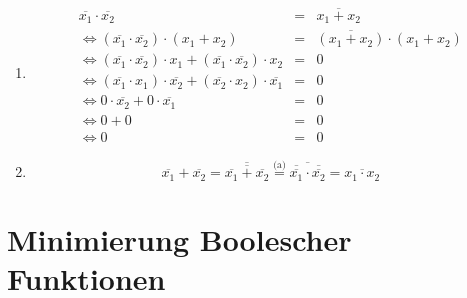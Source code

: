 \documentclass[DIN, pagenumber=false, fontsize=11pt, parskip=half]{scrartcl}
\begin{document}
    \subsection{}
    \begin{enumerate}[label=(\alph*)]
        \item 
            \begin{eqnarray*}
                \overline{x_1} \cdot \overline{x_2} &=& \overline{x_1 + x_2}\\
                \Leftrightarrow (\overline{x_1} \cdot \overline{x_2}) \cdot (x_1 + x_2) &=& \overline{(x_1 + x_2)} \cdot  (x_1 + x_2)\\
                \Leftrightarrow (\overline{x_1} \cdot \overline{x_2}) \cdot x_1 +  (\overline{x_1} \cdot \overline{x_2}) \cdot x_2 &=& 0\\
                \Leftrightarrow (\overline{x_1} \cdot x_1) \cdot \overline{x_2} + (\overline{x_2} \cdot x_2)  \cdot \overline{x_1} &=& 0\\
                \Leftrightarrow 0 \cdot \overline{x_2} + 0 \cdot \overline{x_1} &=& 0\\
                \Leftrightarrow 0 + 0 &=& 0\\
                \Leftrightarrow 0 &=& 0
            \end{eqnarray*}
        \item
            \begin{equation*}
                \overline{x_1} + \overline{x_2} = \overline{\overline{\overline{x_1} + \overline{x_2}}} \stackrel{\text{(a)}}{=}
                \overline{\overline{\overline{x_1}} \cdot \overline{\overline{x_2}}} = \overline{x_1 \cdot x_2}
            \end{equation*}
    \end{enumerate}

    \section{Minimierung Boolescher Funktionen}
    \setcounter{subsection}{2}
\end{document}
